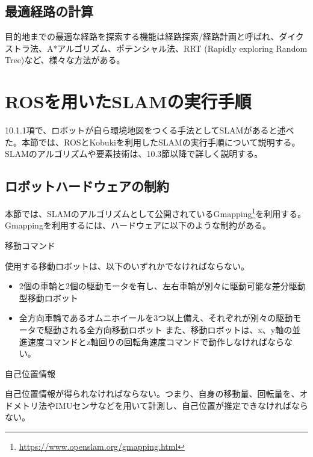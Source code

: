 \subsection{最適経路の計算}

目的地までの最適な経路を探索する機能は経路探索/経路計画と呼ばれ、ダイクストラ法、A*アルゴリズム、ポテンシャル法、RRT (Rapidly exploring Random Tree)など、様々な方法がある。

\section{ROSを用いたSLAMの実行手順}

10.1.1項で、ロボットが自ら環境地図をつくる手法としてSLAMがあると述べた。本節では、ROSとKobukiを利用したSLAMの実行手順について説明する。SLAMのアルゴリズムや要素技術は、10.3節以降で詳しく説明する。

\subsection{ロボットハードウェアの制約}

本節では、SLAMのアルゴリズムとして公開されているGmapping\footnote{\url{https://www.openslam.org/gmapping.html}}を利用する。 Gmappingを利用するには、ハードウェアに以下のような制約がある。

\setcounter{num}{0}

\circled{\thenum} 移動コマンド

使用する移動ロボットは、以下のいずれかでなければならない。

\begin{itemize}
\item 2個の車輪と2個の駆動モータを有し、左右車輪が別々に駆動可能な差分駆動型移動ロボット
\item 全方向車輪であるオムニホイールを3つ以上備え、それぞれが別々の駆動モータで駆動される全方向移動ロボット
また、移動ロボットは、x、y軸の並進速度コマンドとz軸回りの回転角速度コマンドで動作しなければならない。
\end{itemize}

\circled{\thenum} 自己位置情報

自己位置情報が得られなければならない。つまり、自身の移動量、回転量を、オドメトリ法やIMUセンサなどを用いて計測し、自己位置が推定できなければならない。

